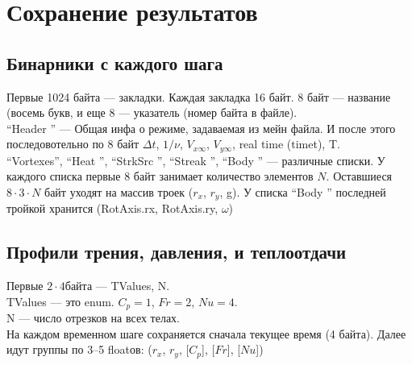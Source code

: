 \documentclass[14pt]{extreport}
\begin{document}
\newpage
\section{Сохранение результатов}

\subsection{Бинарники с каждого шага}
Первые 1024 байта --- закладки. Каждая закладка 16 байт. 8 байт --- название (восемь букв, и еще 8 --- указатель (номер байта в файле).\\
``Header  '' --- Общая инфа о режиме, задаваемая из мейн файла. И после этого последовотельно по 8 байт $\Delta t$, $1/\nu$, $V_{x\infty}$, $V_{y\infty}$, real time (timet), T.\\
``Vortexes'', ``Heat    '', ``StrkSrc '', ``Streak  '', ``Body    '' --- различные списки. У каждого списка первые 8 байт занимает количество элементов $N$. Оставшиеся $8\cdot 3 \cdot N$ байт уходят на массив троек ($r_x$, $r_y$, g). У списка ``Body    '' последней тройкой хранится (RotAxis.rx, RotAxis.ry, $\omega$)


\subsection{Профили трения, давления, и теплоотдачи}
Первые $2 \cdot 4$байта --- TValues, N.\\
TValues --- это enum. $C_p=1$, $Fr=2$, $Nu=4$.\\
N --- число отрезков на всех телах.\\
На каждом временном шаге сохраняется сначала текущее время (4 байта). Далее идут группы по 3--5 floatов: ($r_x$, $r_y$, [$C_p$], [$Fr$], [$Nu$])
\end{document}
